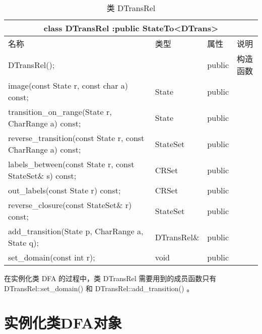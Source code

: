 \begin{table}[!htbp]
    \caption{类 DTransRel}
    \label{tab:Class-DTransRel}
    \centering
    \small%
    \setlength{\tabcolsep}{4pt}%
    \renewcommand{\arraystretch}{1.2}%
        \begin{tabular}{llll} %
        \toprule 
         \multicolumn{4}{c}{class DTransRel :public StateTo<DTrans>} \\
        \midrule
        名称& 类型 & 属性  &\mbox{说明} \\
        \midrule 
        DTransRel(); &  &  public & 构造函数 \\
        image(const State r, const char a) const; & State & public & \\
        transition\_on\_range(State r, CharRange a) const; & State & public & \\
        reverse\_transition(const State r, const CharRange a) const; & StateSet & public & \\
        labels\_between(const State r, const StateSet\& s) const; & CRSet & public & \\
        out\_labels(const State r) const; & CRSet & public & \\
        reverse\_closure(const StateSet\& r) const; & StateSet & public & \\
        add\_transition(State p, CharRange a, State q); & DTransRel\& & public & \\
        set\_domain(const int r); & void & public & \\
        \bottomrule 
    \end{tabular}
\end{table}

在实例化类 DFA 的过程中，类 DTransRel 需要用到的成员函数只有 DTransRel::set\_domain() 和 DTransRel::add\_transition() 。







\section{实例化类DFA对象}\label{sec:get_a_dfa}

